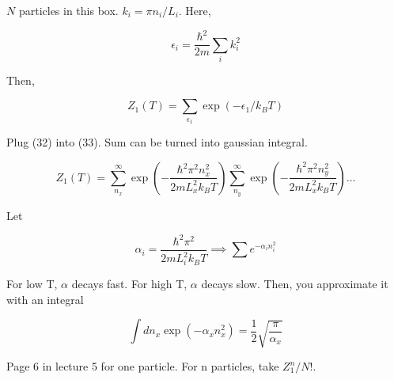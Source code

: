 \documentclass{article}
\newtheorem{one minute paper}[theorem]{One Minute Paper}
\begin{document}
$N$ particles in this box. $k_i = \pi n_i/L_i$. Here, 

\begin{equation}
    \epsilon_i = \frac{\hbar^2}{2m}\sum_i k_i^2
\end{equation}

Then, 

\begin{equation}
    Z_1(T) = \sum_{\epsilon_1}\exp(-\epsilon_1/k_B T)
\end{equation}

Plug (32) into (33). Sum can be turned into gaussian integral. 

\begin{equation}
    Z_1(T) = \sum_{n_x}^{\infty}\exp(-\frac{\hbar^2\pi^2n_x^2}{2m L_x^2 k_B T})\sum_{n_y}^{\infty}\exp(-\frac{\hbar^2\pi^2n_y^2}{2m L_x^2 k_B T})\dots
\end{equation}

Let 

\begin{equation}
    \alpha_i = \frac{\hbar^2 \pi^2}{2m L_i^2 k_B T} \implies \sum e^{-\alpha_i n_i^2}
\end{equation}

For low T, $\alpha$ decays fast. For high T, $\alpha$ decays slow. Then, you approximate it with an integral 

\begin{equation}
    \int dn_x \exp(-\alpha_x n_x^2) = \frac{1}{2}\sqrt{\frac{\pi}{\alpha_x}}
\end{equation}

Page 6 in lecture 5 for one particle. For n particles, take $Z_1^n/N!$. 
\end{document}
